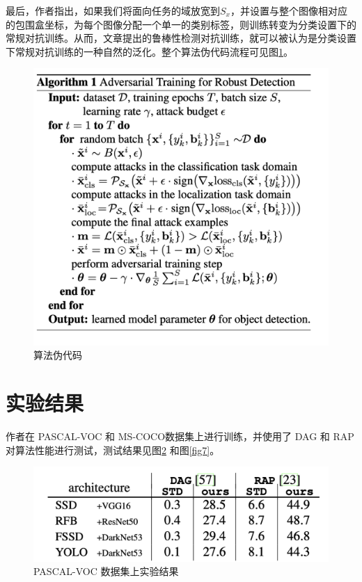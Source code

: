 \documentclass[conference,10pt]{IEEEtran}
\begin{document}
最后，作者指出，如果我们将面向任务的域放宽到$S_x$，并设置与整个图像相对应的包围盒坐标，为每个图像分配一个单一的类别标签，则训练转变为分类设置下的常规对抗训练。从而，文章提出的鲁棒性检测对抗训练，就可以被认为是分类设置下常规对抗训练的一种自然的泛化。整个算法伪代码流程可见图\ref{fig5}。
\begin{figure}[H]
	\centering
	\includegraphics[scale=0.3]{figure/fig5.png}
	\caption{算法伪代码}
	\label{fig5}
\end{figure}

\section{实验结果}
作者在 PASCAL-VOC 和 MS-COCO数据集上进行训练，并使用了 DAG 和 RAP 对算法性能进行测试，测试结果见图\ref{fig6} 和图\ref{fig7}。

\begin{figure}[H]
	\centering
	\includegraphics[scale=0.3]{figure/fig6.png}
	\caption{PASCAL-VOC 数据集上实验结果}
	\label{fig6}
\end{figure}
\end{document}
